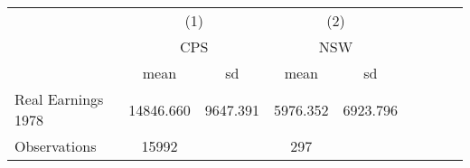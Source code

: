 {
\def\sym#1{\ifmmode^{#1}\else\(^{#1}\)\fi}
\begin{tabular}{l*{2}{cccc}}
\hline\hline
                    &\multicolumn{2}{c}{(1)}  &\multicolumn{2}{c}{(2)}  \\
                    &\multicolumn{2}{c}{CPS}  &\multicolumn{2}{c}{NSW}  \\
                    &        mean&          sd&        mean&          sd\\
\hline
Real Earnings 1978  &   14846.660&    9647.391&    5976.352&    6923.796\\
\hline
Observations        &       15992&            &         297&            \\
\hline\hline
\end{tabular}
}
